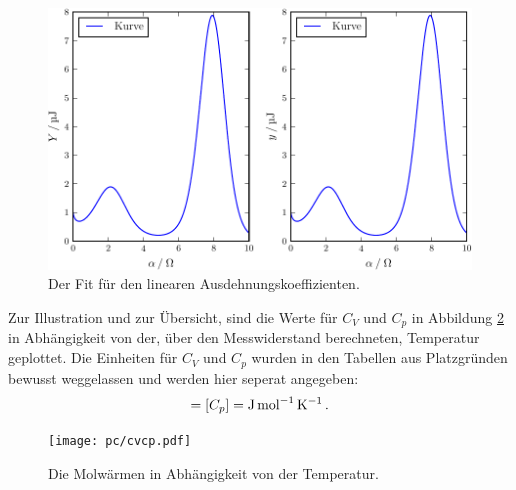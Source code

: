 \begin{figure}
  \centering
  \includegraphics[width=\textwidth]{pc/Plot.pdf}
  \caption{Der Fit für den linearen Ausdehnungskoeffizienten.}
  \label{fig:a}
\end{figure}



Zur Illustration und zur Übersicht, sind die Werte für $C_V$ und $C_p$ in Abbildung \ref{fig:cvcp} in Abhängigkeit von der, über den Messwiderstand berechneten, Temperatur geplottet. Die Einheiten für $C_V$ und $C_p$ wurden in den Tabellen aus Platzgründen bewusst weggelassen und werden hier seperat angegeben:
\begin{equation*}
	[C_V] = [C_p] = \si{\joule\per\mole\per\kelvin}\,\text.
\end{equation*}
\begin{figure}
	\centering
	\texttt{[image: pc/cvcp.pdf]}
	\caption{Die Molwärmen in Abhängigkeit von der Temperatur.}
	\label{fig:cvcp}
\end{figure}
